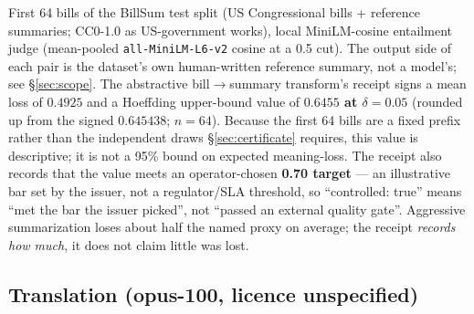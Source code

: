 \documentclass[11pt]{article}
\theoremstyle{definition}
\begin{document}
First 64 bills of the BillSum test split (US Congressional bills + reference
summaries; CC0-1.0 as US-government works), local MiniLM-cosine entailment
judge (mean-pooled \texttt{all-MiniLM-L6-v2} cosine at a 0.5 cut). The output
side of each pair is the dataset's own human-written reference summary, not a
model's; see \S\ref{sec:scope}. The abstractive bill$\to$summary transform's
receipt signs a mean loss of $0.4925$ and a Hoeffding upper-bound value of
\textbf{$0.6455$ at $\delta=0.05$} (rounded up from the signed $0.645438$;
$n=64$). Because the first 64 bills are a fixed prefix rather than the
independent draws \S\ref{sec:certificate} requires, this value is
descriptive; it is not a 95\% bound on expected meaning-loss. The receipt
also records that the value meets an operator-chosen \textbf{0.70 target}
--- an illustrative bar set
by the issuer, not a regulator/SLA threshold, so ``controlled: true'' means
``met the bar the issuer picked'', not ``passed an external quality gate''.
Aggressive summarization loses about half the named proxy on average; the
receipt \emph{records how much}, it does not claim little was lost.

\subsection{Translation (opus-100, licence unspecified)}\label{sec:translation}
\end{document}
